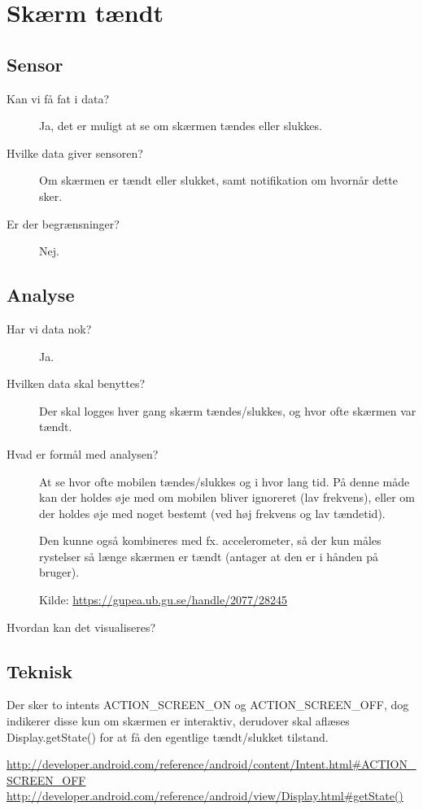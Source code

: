 \section{Skærm tændt}

\subsection{Sensor}

\begin{description}
\item[Kan vi få fat i data?]
Ja, det er muligt at se om skærmen tændes eller slukkes.

\item[Hvilke data giver sensoren?]
Om skærmen er tændt eller slukket, samt notifikation om hvornår dette sker.

\item[Er der begrænsninger?]
Nej.

\end{description}

\subsection{Analyse}
\begin{description}
\item[Har vi data nok?]
Ja.

\item[Hvilken data skal benyttes?]
Der skal logges hver gang skærm tændes/slukkes, og hvor ofte skærmen var tændt.

\item[Hvad er formål med analysen?]
At se hvor ofte mobilen tændes/slukkes og i hvor lang tid.
På denne måde kan der holdes øje med om mobilen bliver ignoreret (lav frekvens), eller om der holdes øje med noget bestemt (ved høj frekvens og lav tændetid).

Den kunne også kombineres med fx. accelerometer, så der kun måles rystelser så længe skærmen er tændt (antager at den er i hånden på bruger).

Kilde: \url{https://gupea.ub.gu.se/handle/2077/28245}

\item[Hvordan kan det visualiseres?]

\end{description}

\subsection{Teknisk}
Der sker to intents ACTION\_SCREEN\_ON og ACTION\_SCREEN\_OFF, dog indikerer disse kun om skærmen er interaktiv, derudover skal aflæses Display.getState() for at få den egentlige tændt/slukket tilstand.

\url{http://developer.android.com/reference/android/content/Intent.html#ACTION_SCREEN_OFF}\\
\url{http://developer.android.com/reference/android/view/Display.html#getState()}

